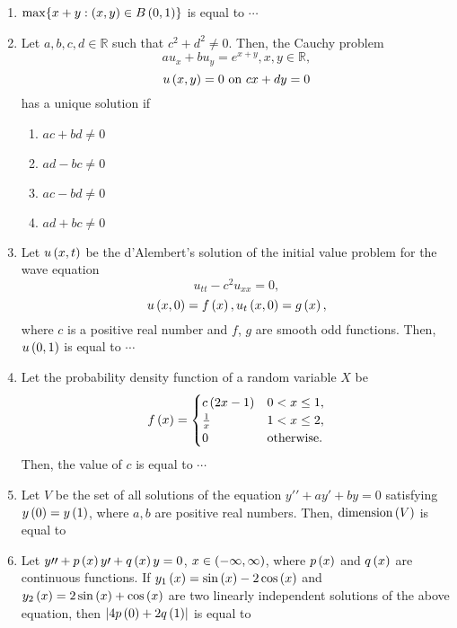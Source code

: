 \documentclass[journal,12pt,twocolumn]{IEEEtran}
\theoremstyle{remark}
\begin{document}
\begin{enumerate}[start=1]
    \item $\max \{x+y : \left(x, y\right) \in B\left(0,1\right)\}$ is equal to $\cdots$



    \item Let $a, b, c, d \in \mathbb{R}$ such that $c^2 + d^2 \neq 0$. Then, the Cauchy problem
    $$a u_x + b u_y = e^{x+y},  x, y \in \mathbb{R},$$
    $$u\left(x,y\right) = 0 \text{ on } cx + dy = 0$$
    has a unique solution if
    \begin{enumerate}
        \item $a c + b d \neq 0$
        \item $a d - b c \neq 0$
        \item $a c - b d \neq 0$
        \item $a d + b c \neq 0$
    \end{enumerate}


    \item Let $u\left(x, t\right)$ be the d'Alembert's solution of the initial value problem for the wave equation
    $$u_{tt} - c^2 u_{xx} = 0,$$
    $$u\left(x, 0\right) = f\left(x\right), u_t\left(x, 0\right) = g\left(x\right),$$
    where $c$ is a positive real number and $f$, $g$ are smooth odd functions. Then, $u\left(0,1\right)$ is equal to $\cdots$

    \item Let the probability density function of a random variable $X$ be
    $$f\left(x\right) = \begin{cases} 
      c\left(2x - 1\right) & 0 < x \leq 1, \\
      \frac{1}{x} & 1 < x \leq 2, \\
      0 & \text{otherwise}.
   \end{cases}$$
    Then, the value of $c$ is equal to $\cdots$

    \item Let $V$ be the set of all solutions of the equation $y{\prime}{\prime} + a y{\prime} + b y = 0$ satisfying $y\left(0\right) = y\left(1\right)$, where $a, b$ are positive real numbers. Then, $\text{dimension}\left(V\right)$ is equal to

    \item Let $y{\prime}{\prime} + p\left(x\right) y{\prime} + q\left(x\right)y = 0$, $x \in \left(-\infty, \infty\right)$, where $p\left(x\right)$ and $q\left(x\right)$ are continuous functions. If $y_1\left(x\right) = \sin\left(x\right) - 2 \cos\left(x\right)$ and $y_2\left(x\right) = 2 \sin\left(x\right) + \cos\left(x\right)$ are two linearly independent solutions of the above equation, then $\left\vert 4p\left(0\right) + 2 q\left(1\right) \right\vert$ is equal to


\end{enumerate}
\end{document}
